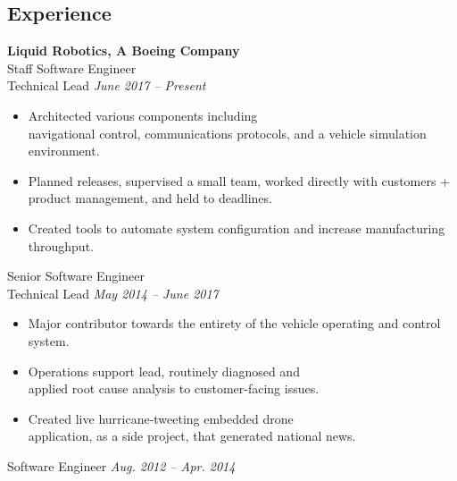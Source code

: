 \documentclass{article}
\begin{document}
{\begin{multicols}{2}
\section*{Experience}
\noindent
    \textbf{Liquid Robotics, A Boeing Company}\\
    Staff Software Engineer\\
    Technical Lead \hfill \textsl{June 2017 -- Present} \\
    \vspace{ -10px}
    \begin{itemize}[noitemsep,nolistsep]
        \item Architected various components including \\navigational control, communications protocols, and a vehicle simulation environment.
        \item Planned releases, supervised a small team, worked directly with customers + product management, and held to deadlines.
        \item Created tools to automate system configuration and increase manufacturing throughput.
    \end{itemize}
    \vspace{10px}
    Senior Software Engineer\\
    Technical Lead \hfill \textsl{May 2014 -- June 2017} \\
    \vspace{ -10px}
    \begin{itemize}[noitemsep,nolistsep]
    	\item Major contributor towards the entirety of the vehicle operating and control system.
         \item Operations support lead, routinely diagnosed and \\applied root cause analysis to customer-facing issues.
         \item Created live hurricane-tweeting embedded drone \\application, as a side project, that generated national news.
    \end{itemize}
    \vspace{10px}
    Software Engineer \hfill \textsl{Aug. 2012 -- Apr. 2014}\\
    \vspace{ -10px}

\end{multicols}}
\end{document}

